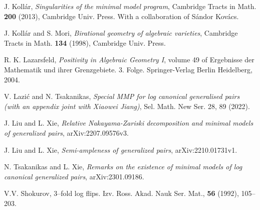 \documentclass[11pt]{amsart}
\numberwithin{equation}{section}
\theoremstyle{definition}
\theoremstyle{definition}
\theoremstyle{definition}
\begin{document}
\begin{thebibliography}{ABCDE}
 J. Koll\'ar, \textit{Singularities of the minimal model program}, Cambridge Tracts in Math. \textbf{200} (2013), Cambridge Univ. Press. With a collaboration of S\'andor Kov\'acs.

 J. Koll\'{a}r and S. Mori, \textit{Birational geometry of algebraic varieties}, Cambridge Tracts in Math. \textbf{134} (1998), Cambridge Univ. Press.

R. K. Lazarsfeld, \textit{ Positivity in Algebraic Geometry I}, volume 49 of Ergebnisse der Mathematik
und ihrer Grenzgebiete. 3. Folge. Springer-Verlag Berlin Heidelberg, 2004.

 V. Lazi\'c and N. Tsakanikas, \textit{Special MMP for log canonical generalised pairs (with an appendix joint with Xiaowei Jiang)},  Sel. Math. New Ser. 28, 89 (2022).

 J. Liu and L. Xie, \textit{Relative Nakayama-Zariski decomposition and minimal models of generalized pairs}, arXiv:2207.09576v3.

 J. Liu and L. Xie, \textit{Semi-ampleness of generalized pairs}, arXiv:2210.01731v1.

 N. Tsakanikas and L. Xie, \textit{Remarks on the existence of minimal models of log canonical generalized pairs}, arXiv:2301.09186.

 V.V. Shokurov, {3--fold log flips}. Izv. Ross. Akad. Nauk Ser. Mat., \textbf{56} (1992), 105--203. 
\end{thebibliography}
\end{document}
